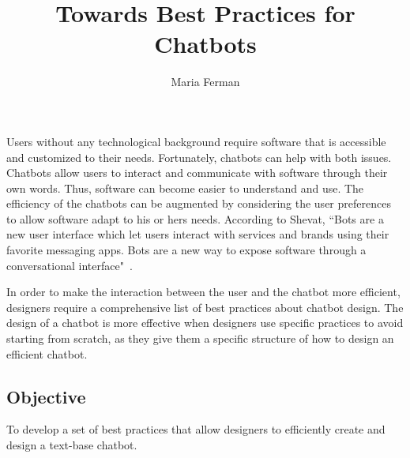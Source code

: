 \documentclass[a4paper,10pt]{article}
\title{Towards Best Practices for Chatbots}
\author{Maria Ferman}
\begin{document}
\maketitle


Users without any technological background require software that is accessible and customized to their needs. Fortunately, chatbots can help with both issues. Chatbots allow users to interact and communicate with software through their own words. Thus, software can become easier to understand and use. The efficiency of the chatbots can be augmented by considering the user preferences to allow software adapt to his or hers needs. According to Shevat,  ``Bots are a new user interface which let users interact with services and brands using their favorite messaging apps. Bots are a new way to expose software through a conversational interface"~\cite{Shevat2017}. 

In order to make the interaction between the user and the chatbot more efficient, designers require a comprehensive list of best practices about chatbot design. 
The design of a chatbot is more effective when designers use specific practices to avoid starting from scratch, as they give them a specific structure of how to design an efficient chatbot. 

\subsection*{Objective}


To develop a set of best practices that allow designers to efficiently create and design a text-base chatbot. 

\end{document}
